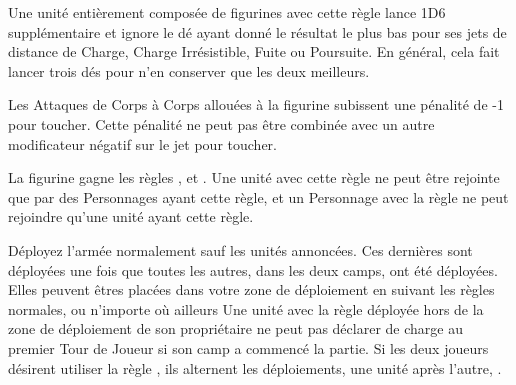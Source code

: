 
Une unité entièrement composée de figurines avec cette règle lance 1D6 supplémentaire et ignore le dé ayant donné le résultat le plus bas pour ses jets de distance de Charge, Charge Irrésistible, Fuite ou Poursuite. En général, cela fait lancer trois dés pour n'en conserver que les deux meilleurs.


Les Attaques de Corps à Corps allouées à la figurine subissent une pénalité de -1 pour toucher. Cette pénalité ne peut pas être combinée avec un autre modificateur négatif sur le jet pour toucher.


La figurine gagne les règles \magicalattacks{}, \immunetopsychology{} et . Une unité avec cette règle ne peut être rejointe que par des Personnages ayant cette règle, et un Personnage avec la règle \otherworldly{} ne peut rejoindre qu'une unité ayant cette règle.


 Déployez l'armée normalement sauf les unités annoncées. Ces dernières sont déployées une fois que toutes les autres, dans les deux camps, ont été déployées. Elles peuvent êtres placées dans votre zone de déploiement en suivant les règles normales, ou n'importe où ailleurs  Une unité avec la règle \scout{} déployée hors de la zone de déploiement de son propriétaire ne peut pas déclarer de charge au premier Tour de Joueur si son camp a commencé la partie. Si les deux joueurs désirent utiliser la règle \scout{}, ils alternent les déploiements, une unité après l'autre, .


